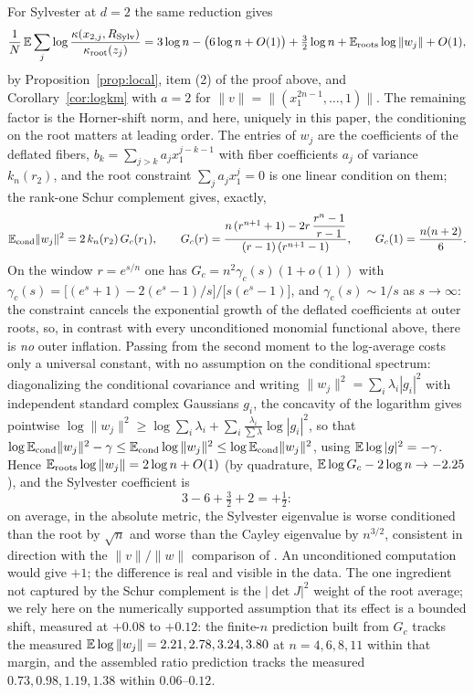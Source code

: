 For Sylvester at $d=2$ the same reduction gives
\[
  \frac1N\,\mathbb{E}\sum_j\log\frac{\kappa(x_{2,j},R_{\mathrm{Sylv}})}{\kappa_{\mathrm{root}}(z_j)}
  = 3\log n - \bigl(6\log n + O(1)\bigr) + \tfrac32\log n
  + \mathbb{E}_{\mathrm{roots}}\log\|w_j\| + O(1),
\]
by Proposition~\ref{prop:local}, item (2) of the proof above, and
Corollary~\ref{cor:logkm} with $a=2$ for $\|v\| = \|(x_1^{2n-1},\dots,1)\|$. The remaining
factor is the Horner-shift norm, and here, uniquely in this paper, the conditioning on the
root matters at leading order. The entries of $w_j$ are the coefficients of the deflated
fibers, $b_k = \sum_{j>k}a_jx_1^{j-k-1}$ with fiber coefficients $a_j$ of variance
$k_n(r_2)$, and the root constraint $\sum_ja_jx_1^j = 0$ is one linear condition on them;
the rank-one Schur complement gives, exactly,
\[
  \mathbb{E}_{\mathrm{cond}}\|w_j\|^2 = 2\,k_n(r_2)\,G_c(r_1), \qquad
  G_c(r) = \frac{n\,(r^{n+1}+1) - 2r\,\dfrac{r^n-1}{r-1}}{(r-1)\,(r^{n+1}-1)}, \qquad
  G_c(1) = \frac{n(n+2)}6.
\]
On the window $r=e^{s/n}$ one has $G_c = n^2\gamma_c(s)(1+o(1))$ with
$\gamma_c(s) = \bigl[(e^s+1) - 2(e^s-1)/s\bigr]/\bigl[s(e^s-1)\bigr]$, and
$\gamma_c(s)\sim1/s$ as $s\to\infty$: the constraint cancels the exponential growth of the
deflated coefficients at outer roots, so, in contrast with every unconditioned monomial
functional above, there is \emph{no} outer inflation. Passing from the second moment to the
log-average costs only a universal constant, with no assumption on the conditional
spectrum: diagonalizing the conditional covariance and writing
$\|w_j\|^2 = \sum_i\lambda_i|g_i|^2$ with independent standard complex Gaussians $g_i$, the
concavity of the logarithm gives pointwise
$\log\|w_j\|^2\ge\log\sum_i\lambda_i + \sum_i\frac{\lambda_i}{\sum\lambda}\log|g_i|^2$, so
that
$\log\mathbb{E}_{\mathrm{cond}}\|w_j\|^2 - \gamma
\le\mathbb{E}_{\mathrm{cond}}\log\|w_j\|^2\le\log\mathbb{E}_{\mathrm{cond}}\|w_j\|^2$, using
$\mathbb{E}\log|g|^2 = -\gamma$. Hence $\mathbb{E}_{\mathrm{roots}}\log\|w_j\| = 2\log n + O(1)$ (by quadrature,
$\mathbb{E}\log G_c - 2\log n\to-2.25$), and the Sylvester coefficient is
\[
  3 - 6 + \tfrac32 + 2 = +\tfrac12:
\]
on average, in the absolute metric, the Sylvester eigenvalue is worse conditioned than the
root by $\sqrt n$ and worse than the Cayley eigenvalue by $n^{3/2}$, consistent in
direction with the $\|v\|/\|w\|$ comparison of \cite[Sec.~4.3]{noferini2016numerical}. An
unconditioned computation would give $+1$; the difference is real and visible in the data.
The one ingredient not captured by the Schur complement is the $|\det J|^2$ weight of the
root average; we rely here on the numerically supported assumption that its effect is a
bounded shift, measured at $+0.08$ to $+0.12$: the finite-$n$ prediction built from $G_c$
tracks the measured $\mathbb{E}\log\|w_j\| = 2.21, 2.78, 3.24, 3.80$ at $n=4,6,8,11$ within that
margin, and the assembled ratio prediction tracks the measured $0.73, 0.98, 1.19, 1.38$
within $0.06$--$0.12$.

